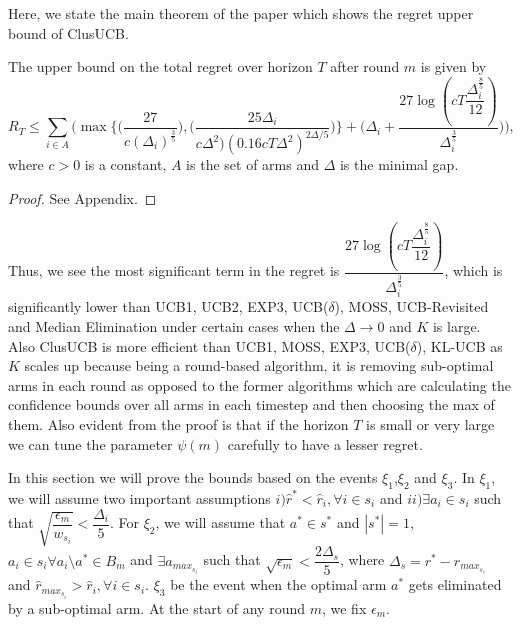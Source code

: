 	
	Here, we state the main theorem of the paper which shows the regret upper bound of ClusUCB.
	
\begin{theorem}
The upper bound on the total regret over horizon $T$ after round $m$ is given by 
$$R_{T}\leq \sum_{i\in A}\bigg (\max{\bigg\lbrace \bigg(\dfrac{27}{c(\Delta_{i})^{\frac{3}{5}}}\bigg) ,\bigg(\dfrac{25\Delta_{i}}{c\Delta^{2})(0.16cT\Delta^{2})^{2\Delta/5}}\bigg)\bigg\rbrace} + \bigg(\Delta_{i}+\dfrac{27\log{(cT\dfrac{\Delta_{i}^{\frac{8}{5}}}{12})}}{\Delta_{i}^{\frac{3}{5}}}\bigg)\bigg),$$ 
where $c>0$ is a constant, $A$ is the set of arms and $\Delta$ is the minimal gap.
\end{theorem}
\begin{proof}
	See Appendix.
\end{proof}

\begin{remark}
	Thus, we see the most significant term in the regret is $\dfrac{27\log{(cT\dfrac{\Delta_{i}^{\frac{8}{5}}}{12})}}{\Delta_{i}^{\frac{3}{5}}}$, which is significantly lower than UCB1, UCB2, EXP3, UCB($\delta$), MOSS, UCB-Revisited and Median Elimination under certain cases when the $\Delta \rightarrow 0$ and $K$ is large. Also ClusUCB is more efficient than UCB1, MOSS, EXP3, UCB($\delta$), KL-UCB as $K$ scales up because being a round-based algorithm, it is removing sub-optimal arms in each round as opposed to the former algorithms which are calculating the confidence bounds over all arms in each timestep and then choosing the max of them. Also evident from the proof is that if the horizon $T$ is small or very large we can tune the parameter $\psi(m)$ carefully to have a lesser regret.
\end{remark}	


In this section we will prove the bounds based on the events $\xi_{1}$,$\xi_{2}$ and $\xi_{3}$. In $\xi_{1}$, we will assume two important assumptions $i)\hat{r}^{*}<\hat{r}_{i},\forall i\in s_{i}$ and $ii)\exists a_{i}\in s_{i}$ such that $\sqrt{\dfrac{\epsilon_{m}}{w_{s_{i}}}}<\dfrac{\Delta_{i}}{5}$. For $\xi_{2}$, we will assume that $a^{*}\in s^{*}$ and $|s^{*}|=1$, $a_{i}\in s_{i} \forall a_{i}\setminus a^{*}\in B_{m}$ and $\exists a_{max_{s_{i}}}$ such that $\sqrt{\epsilon_{m}}<\dfrac{2\Delta_{s}}{5}$, where $\Delta_{s}=r^{*}-r_{max_{s_{i}}}$ and $\hat{r}_{max_{s_{i}}}>\hat{r}_{i}, \forall i\in s_{i}$. $\xi_{3}$ be the event when the optimal arm $a^{*}$ gets eliminated by a sub-optimal arm. At the start of any round $m$, we fix $\epsilon_{m}$.

